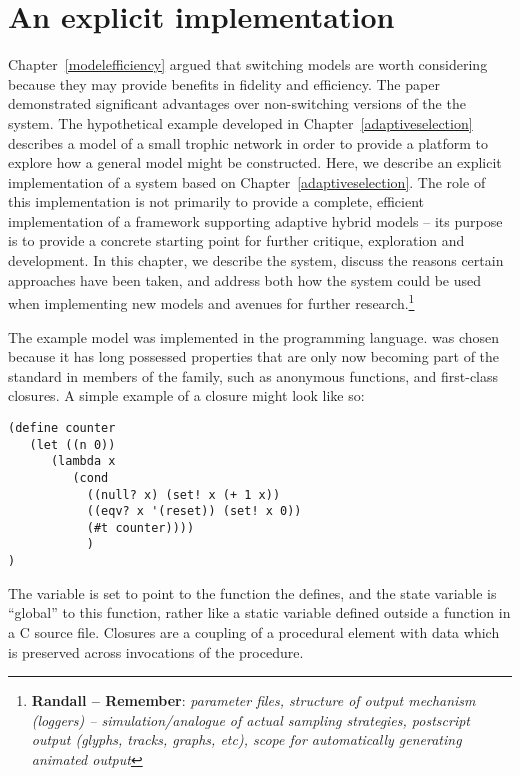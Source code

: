 

\chapter[AN EXPLICIT IMPLEMENTATION]{An explicit implementation}
\WeAreOn{\cfive}\label{explicitmodel}


Chapter~\ref{modelefficiency} argued that switching models are worth
considering because they may provide benefits in fidelity and
efficiency. The paper demonstrated significant advantages over
non-switching versions of the the system.  The hypothetical example
developed in Chapter~\ref{adaptiveselection} describes a model of a
small trophic network in order to provide a platform to explore how a
general model might be constructed. Here, we describe an explicit
implementation of a system based on
Chapter~\ref{adaptiveselection}. The role of this implementation is
not primarily to provide a complete, efficient implementation of a
framework supporting adaptive hybrid models --  its purpose is to
provide a concrete starting point for further critique, exploration
and development.  In this chapter, we describe the system, discuss the
reasons certain approaches have been taken, and address both how the
system could be used when implementing new models and avenues for
further research.\footnote{ \textbf{Randall -- Remember}: \textit{parameter files, structure of output
  mechanism (loggers) -- simulation/analogue of actual sampling
  strategies, postscript output (glyphs, tracks, graphs, etc), scope for automatically generating
  animated output }}


The example model was implemented in the \Scheme programming language.
\Scheme was chosen because it has long possessed properties that are
only now becoming part of the standard in members of the \CC family, such as
anonymous functions, and first-class closures. A simple example of a
closure might look like so:
\begin{verbatim}
(define counter 
   (let ((n 0))
      (lambda x 
         (cond
           ((null? x) (set! x (+ 1 x))
           ((eqv? x '(reset)) (set! x 0))
           (#t counter))))
           )
)
\end{verbatim}
The variable  is set to point to the function the
 defines, and the state variable  is
``global'' to this function, rather like a static variable defined
outside a function in a C source file. Closures are a
coupling of a procedural element with data which is preserved across
invocations of the procedure.

